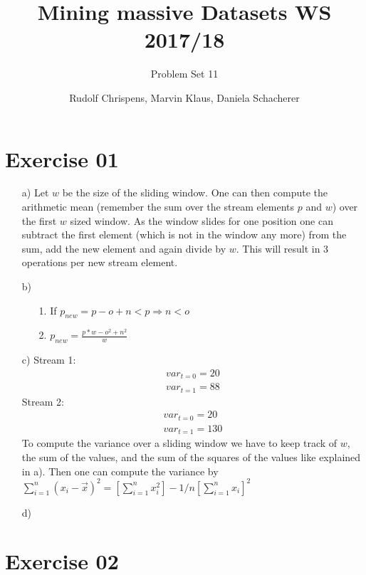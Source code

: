 \documentclass[11pt,a4paper]{scrartcl}
\title{Mining massive Datasets WS 2017/18}
\subtitle{Problem Set 11}
\author{Rudolf Chrispens, Marvin Klaus, Daniela Schacherer}
\begin{document}
\maketitle

\section*{Exercise 01}
\begin{itemize}
	\item[a)] Let $w$ be the size of the sliding window. One can then compute the arithmetic mean (remember the sum over the stream elements $p$ and $w$) over the first $w$ sized window. As the window slides for one position one can subtract the first element (which is not in the window any more) from the sum, add the new element and again divide by $w$. This will result in 3 operations per new stream element.  
	\item[b)]
	\begin{itemize}
		\item[1.] If $p_{new} = p-o+n < p \Rightarrow n < o$
		\item[2.] $p_{new} = \frac{p*w -o^2 + n^2}{w}$
	\end{itemize}
	\item[c)] Stream 1: 
	\begin{align*}
		var_{t=0} = 20 \\
		var_{t=1} = 88
	\end{align*}
	Stream 2: 
	\begin{align*}
		var_{t=0} = 20 \\
		var_{t=1} = 130
	\end{align*}
	To compute the variance over a sliding window we have to keep track of $w$, the sum of the values, and the sum of the squares of the values like explained in a). Then one can compute the variance by $\sum_{i=1}^n (x_i - \vec{x})^2 = [\sum_{i=1}^n x_i^2] - 1/n [\sum_{i=1}^n x_i]^2$
	\item[d)] 
	
\end{itemize}
\section*{Exercise 02}
\end{document}
